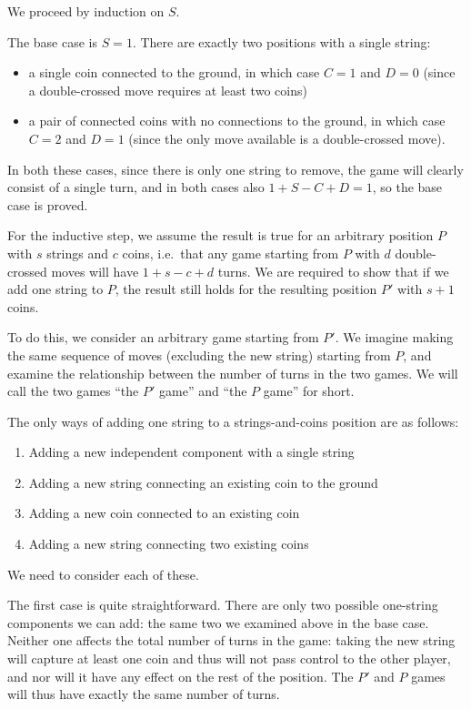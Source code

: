 \documentclass[a4paper,twocolumn]{article}
\begin{document}
We proceed by induction on $S$.

The base case is $S=1$. There are exactly two positions with a
single string:

\begin{itemize}
  \item a single coin connected to the ground, in which case $C=1$ and
    $D=0$ (since a double-crossed move requires at least two coins)
  \item a pair of connected coins with no connections to the ground,
    in which case $C=2$ and $D=1$ (since the only move available is
    a double-crossed move).
\end{itemize}

In both these cases, since there is only one string to remove, the
game will clearly consist of a single turn, and in both cases also
$1+S-C+D = 1$, so the base case is proved.

For the inductive step, we assume the result is true for an
arbitrary position $P$ with $s$ strings and $c$ coins, i.e.\ that any
game starting from $P$ with $d$ double-crossed moves will have
$1+s-c+d$ turns. We are required to show that if we add one string
to $P$, the result still holds for the resulting position $P'$ with
$s+1$ coins.

To do this, we consider an arbitrary game starting from $P'$. We
imagine making the same sequence of moves (excluding the new string)
starting from $P$, and examine the relationship between the number
of turns in the two games. We will call the two games ``the $P'$
game'' and ``the $P$ game'' for short.

The only ways of adding one string to a strings-and-coins position
are as follows:

\begin{enumerate}
  \item Adding a new independent component with a single string
  \item Adding a new string connecting an existing coin to the
    ground
  \item Adding a new coin connected to an existing coin
  \item Adding a new string connecting two existing coins
\end{enumerate}

We need to consider each of these.

The first case is quite straightforward. There are only two possible
one-string components we can add: the same two we examined above in
the base case. Neither one affects the total number of turns in the
game: taking the new string will capture at least one coin and thus
will not pass control to the other player, and nor will it have any
effect on the rest of the position. The $P'$ and $P$ games will thus
have exactly the same number of turns.
\end{document}
